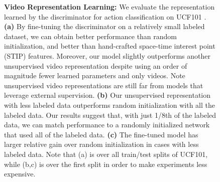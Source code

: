 \documentclass{article}
\begin{document}
\begin{figure}
\centerline{
\setlength{\tabcolsep}{0pt}
}

\caption{\textbf{Video Representation Learning:} We evaluate the representation learned by the discriminator for action classification on UCF101 \cite{soomro2012ucf101}. \textbf{(a)} By fine-tuning the discriminator on a relatively small labeled dataset, we can obtain better performance than random initialization, and better than hand-crafted space-time interest point (STIP) features. Moreover, our model slightly outperforms another  unsupervised video representation \cite{misra2016unsupervised} despite using an order of magnitude fewer learned parameters and only  videos. Note unsupervised video representations are still far from models that leverage external supervision. \textbf{(b)} Our unsupervised representation with less labeled data outperforms random initialization with all the labeled data. Our results suggest that, with just 1/8th of the labeled data, we can match performance to a randomly initialized network that used all of the labeled data. \textbf{(c)} The fine-tuned model has larger relative gain over random initialization in cases with less labeled data. Note that (a) is over all train/test splits of UCF101, while (b,c) is over
the first split in order to make experiments less expensive.}
\vspace{-1em}
\end{figure}
\end{document}
